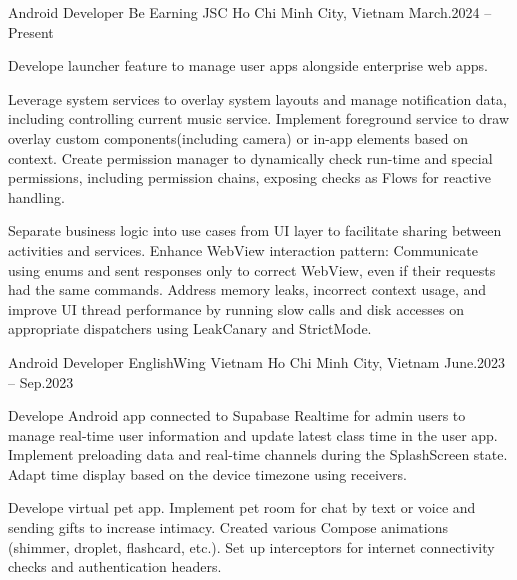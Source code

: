 \begin{cventries}

    \cventry
    {Android Developer}
    {Be Earning JSC}
    {Ho Chi Minh City, Vietnam}
    {March.2024 -- Present}
    {
        \begin{cvitems}
            \item {
                Develope launcher feature to manage user apps alongside enterprise web apps.
            }
            \item {
                Leverage system services to overlay system layouts and manage notification data, including controlling current music service.
                Implement foreground service to draw overlay custom components(including camera) or in-app elements based on context.
                Create permission manager to dynamically check run-time and special permissions, including permission chains, exposing checks as Flows for reactive handling.
            }
            \item {
                Separate business logic into use cases from UI layer to facilitate sharing between activities and services.
                Enhance WebView interaction pattern: Communicate using enums and sent responses only to correct WebView, even if their requests had the same commands.
                Address memory leaks, incorrect context usage, and improve UI thread performance by running slow calls and disk accesses on appropriate dispatchers using LeakCanary and StrictMode.
            }
        \end{cvitems}
    }

    \cventry
    {Android Developer}
    {EnglishWing Vietnam}
    {Ho Chi Minh City, Vietnam}
    {June.2023 -- Sep.2023}
    {
        \begin{cvitems}
            \item {
                Develope Android app connected to Supabase Realtime for admin users to manage real-time user information and update latest class time in the user app.
                Implement preloading data and real-time channels during the SplashScreen state.
                Adapt time display based on the device timezone using receivers.
            }
            \item {
                Develope virtual pet app.
                Implement pet room for chat by text or voice and sending gifts to increase intimacy.
                Created various Compose animations (shimmer, droplet, flashcard, etc.).
                Set up interceptors for internet connectivity checks and authentication headers.
            }
        \end{cvitems}
    }

\end{cventries}
